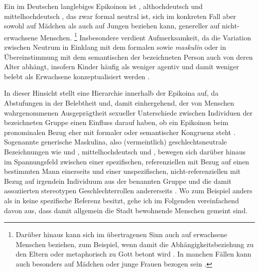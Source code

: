 Ein im Deutschen langlebiges Epikoinon ist ,
althochdeutsch  und
mittelhochdeutsch , das zwar formal neutral
ist, sich im konkreten Fall aber sowohl auf Mädchen als auch auf Jungen
beziehen kann, genereller auf nicht-erwachsene Menschen.%
%
	\footnote{Darüber hinaus kann sich  im übertragenen Sinn auch auf
		erwachsene Menschen beziehen, zum Beispiel, wenn damit die
		Abhängigkeitsbeziehung zu den Eltern oder metaphorisch zu Gott betont
		wird \autocite[s.\,v.~\textit{kint}]{lexer:mhdhwb}. In manchen Fällen
		kann  auch besonders auf Mädchen oder junge Frauen bezogen
		sein \autocites[808--816]{drw7}[s.\,v.~\textit{Kind}]{duden-online}.}
%
Insbesondere  verdient Aufmerksamkeit, da die Variation zwischen
Neutrum in Einklang mit dem formalen  sowie \emph{maskulin}
oder  in Übereinstimmung mit dem semantischen
 der bezeichneten Person auch von
deren Alter abhängt, insofern Kinder häufig als weniger agentiv und damit
weniger belebt als Erwachsene konzeptualisiert werden
\autocites[196]{comrie1989}[258--259]{birkenesfleischer2022}[151]{klein2022}.

In dieser Hinsicht stellt \citet[172--174]{klein2022} eine Hierarchie innerhalb
der Epikoina auf, da Abstufungen in der Belebtheit und, damit einhergehend, der
von Menschen wahrgenommenen Ausgeprägtheit sexueller Unterschiede zwischen
Individuen der bezeichneten Gruppe einen Einfluss darauf haben, ob ein
Epikoinon beim pronominalen Bezug eher mit formaler oder
semantischer Kongruenz steht
\autocite[vgl.~auch][74--83]{kotthoffnuebling2018}. Sogenannte generische
Maskulina, also (vermeintlich) geschlechtsneutrale
Bezeichnungen wie  und ,
mittelhochdeutsch  und ,
bewegen sich darüber hinaus im Spannungsfeld zwischen einer spezifischen,
referenziellen  mit Bezug auf einen bestimmten Mann
einerseits und einer unspezifischen, nicht-referenziellen  mit
Bezug auf irgendein Individuum aus der benannten Gruppe und die damit
assoziierten stereotypen Geschlechterrollen andererseits
\autocites[91--122]{kotthoffnuebling2018}[159--160, 179--180]{klein2022}. Wo
zum Beispiel  anders als in  keine
spezifische Referenz besitzt, gehe ich im Folgenden vereinfachend davon aus,
dass damit allgemein die Stadt bewohnende Menschen gemeint sind.

